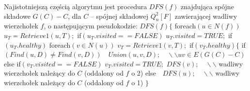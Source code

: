 \documentclass{pracamgr}
\begin{document}
    Najistotniejszą częścią algorytmu jest procedura $DFS(f)$ znajdująca spójne składowe $G(C)-C$,
    dla $C$ -- spójnej składowej $Q_n^2[F]$ zawierającej wadliwy wierzchołek $f$, o następującym pseudokodzie:\newline\newline    
    \hspace*{0pt}$DFS(f)\{$\newline
    \hspace*{16pt}	foreach$(u\in N(f))$\newline
    \hspace*{32pt}		$u_T=Retrieve1(u,T);$\newline
    \hspace*{32pt}		if$(u_T.visited==FALSE)$\newline
    \hspace*{48pt}			$u_T.visited=TRUE;$\newline
    \hspace*{48pt}			if$(u_T.healthy)$\newline
    \hspace*{64pt}				foreach$(v\in N(u))$\newline
    \hspace*{80pt}					$v_T=Retrieve1(v,T);$\newline
    \hspace*{80pt}					if$(v_T.healthy)\{$\newline
    \hspace*{96pt}						if$(Find(u,D)\neq Find(v,D))\quad Union(u,v,D);\quad\backslash\backslash uv\in E(G(C)-C)$\newline
    \hspace*{80pt}					else if$(v_T.visited==FALSE)$\newline
    \hspace*{96pt}						$v_T.visited=TRUE;$\newline
    \hspace*{96pt}						$DFS(v);\quad\backslash\backslash$ wadliwy wierzchołek należący do $C$ (oddalony od $f$ o 2)\newline
    \hspace*{48pt}			else$\quad DFS(u);\quad\backslash\backslash$ wadliwy wierzchołek należący do $C$ (oddalony od $f$ o 1)\newline
    \hspace*{0pt}$\}$\newline
    
\end{document}
